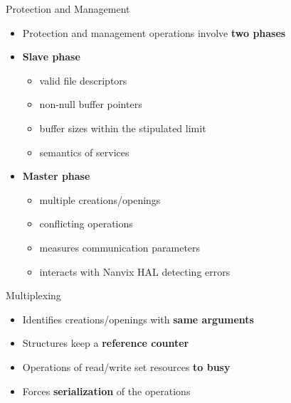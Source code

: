 		\begin{frame}[fragile]{Protection and Management}
			\begin{itemize}
				\item Protection and management operations involve \textbf{two phases}
				\item \textbf{Slave phase}
				\begin{itemize}
					\item valid file descriptors
					\item non-null buffer pointers
					\item buffer sizes within the stipulated limit
					\item semantics of services
				\end{itemize}
				\item \textbf{Master phase}
				\begin{itemize}
					\item multiple creations/openings
					\item conflicting operations
					\item measures communication parameters
					\item interacts with Nanvix HAL detecting errors
				\end{itemize}
			\end{itemize}

		\end{frame}

		\begin{frame}[fragile]{Multiplexing}
			\begin{itemize}
				\item Identifies creations/openings with \textbf{same arguments}
				\item Structures keep a \textbf{reference counter}
				\item Operations of read/write set resources \textbf{to busy}
				\item Forces \textbf{serialization} of the operations
			\end{itemize}

		\end{frame}

